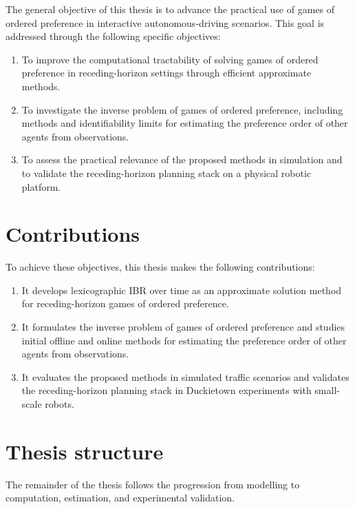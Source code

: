 The general objective of this thesis is to advance the practical use of
games of ordered preference in interactive autonomous-driving scenarios.
This goal is addressed through the following specific objectives:

\begin{enumerate}
    \item To improve the computational tractability of solving games of ordered preference in receding-horizon settings through efficient approximate methods.
    \item To investigate the inverse problem of games of ordered preference, including methods and identifiability limits for estimating the preference order of other agents from observations.
    \item To assess the practical relevance of the proposed methods in simulation and to validate the receding-horizon planning stack on a physical robotic platform.
\end{enumerate}

\section{Contributions}

To achieve these objectives, this thesis makes the following contributions:

\begin{enumerate}
    \item It develops lexicographic IBR over time as an approximate solution method for receding-horizon games of ordered preference.
    \item It formulates the inverse problem of games of ordered preference and studies initial offline and online methods for estimating the preference order of other agents from observations.
    \item It evaluates the proposed methods in simulated traffic scenarios and validates the receding-horizon planning stack in Duckietown experiments with small-scale robots.
\end{enumerate}

\section{Thesis structure}

The remainder of the thesis follows the progression from modelling to
computation, estimation, and experimental validation.

